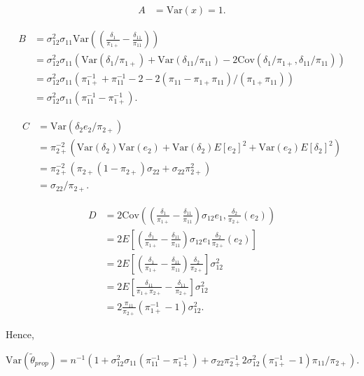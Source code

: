 \documentclass[12pt]{article}
\newcommand{\Cov}{{\text{Cov}}}
\newcommand{\Var}{{\text{Var}}}
\begin{document}
\begin{align*}
  A &= \Var(x) = 1.
\end{align*}

\begin{align*}
  B &= \sigma_{12}^2 \sigma_{11} \Var\left(
    \left(\frac{\delta_{1}}{\pi_{1+}} - \frac{\delta_{11}}{\pi_{11}}\right)
  \right)\\
    &=  \sigma_{12}^2 \sigma_{11} \left(\Var(\delta_1 / \pi_{1+}) + 
      \Var(\delta_{11}/\pi_{11}) - 
      2\Cov(\delta_1 / \pi_{1+}, \delta_{11} / \pi_{11}) \right)\\
    &= \sigma_{12}^2 \sigma_{11}(\pi_{1+}^{-1} + \pi_{11}^{-1} - 2 - 2(\pi_{11}
    - \pi_{1+} \pi_{11}) / (\pi_{1+}\pi_{11}))\\
    &= \sigma_{12}^2 \sigma_{11}(\pi_{11}^{-1} - \pi_{1+}^{-1}).
\end{align*}

\begin{align*}
  C &= \Var(\delta_2 e_2 / \pi_{2+})\\
    &= \pi_{2+}^{-2}(\Var(\delta_2)\Var(e_2) + \Var(\delta_2)E[e_2]^2 +
    \Var(e_2)E[\delta_2]^2)\\
    &= \pi_{2+}^{-2} (\pi_{2+}(1 - \pi_{2+}) \sigma_{22} + \sigma_{22}\pi_{2+}^2)\\
    &= \sigma_{22} / \pi_{2+}.
\end{align*}

\begin{align*}
  D &= 2\Cov\left(
    \left(\frac{\delta_{1}}{\pi_{1+}} - \frac{\delta_{11}}{\pi_{11}}\right)
    \sigma_{12} e_{1}, \frac{\delta_{2}}{\pi_{2+}} (e_{2}) \right)\\
    &= 2E\left[
    \left(\frac{\delta_{1}}{\pi_{1+}} - \frac{\delta_{11}}{\pi_{11}}\right)
    \sigma_{12} e_{1} \frac{\delta_{2}}{\pi_{2+}} (e_{2}) 
    \right] \\ 
    &= 2E\left[
    \left(\frac{\delta_{1}}{\pi_{1+}} - \frac{\delta_{11}}{\pi_{11}}\right)
    \frac{\delta_{2}}{\pi_{2+}}
    \right] \sigma_{12}^2\\
    &= 2E\left[\frac{\delta_{11}}{\pi_{1+}\pi_{2+}} - \frac{\delta_{11}}{\pi_{2+}}
    \right] \sigma_{12}^2\\
    &= 2 \frac{\pi_{11}}{\pi_{2+}} (\pi_{1+}^{-1} - 1) \sigma_{12}^2.
\end{align*}

Hence,

\begin{equation}\label{eq:varprop}
\Var(\tilde \theta_{prop}) = n^{-1}(1 +
  \sigma_{12}^2\sigma_{11}(\pi_{11}^{-1} - \pi_{1+}^{-1}) + \sigma_{22}
  \pi_{2+}^{-1} 2\sigma_{12}^2 (\pi_{1+}^{-1} - 1) \pi_{11}/ \pi_{2+}).
\end{equation}
\end{document}
